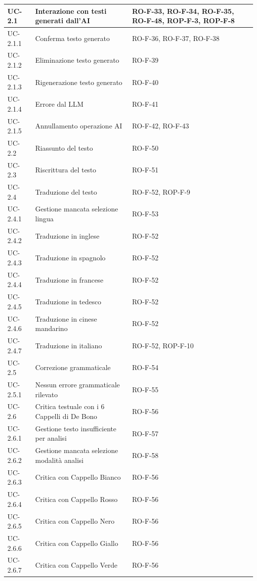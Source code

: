 \documentclass[11pt,a4paper]{article}
\begin{document}
\begin{longtable}{|p{}|p{}|>{\raggedright\arraybackslash}p{}|}
\hline
UC-2.1 & Interazione con testi generati dall'AI & RO-F-33, RO-F-34, RO-F-35, RO-F-48, ROP-F-3, ROP-F-8 \\
\hline
UC-2.1.1 & Conferma testo generato & RO-F-36, RO-F-37, RO-F-38 \\
\hline
UC-2.1.2 & Eliminazione testo generato & RO-F-39 \\
\hline
UC-2.1.3 & Rigenerazione testo generato & RO-F-40 \\
\hline
UC-2.1.4 & Errore dal LLM & RO-F-41 \\
\hline
UC-2.1.5 & Annullamento operazione AI & RO-F-42, RO-F-43 \\
\hline
UC-2.2 & Riassunto del testo & RO-F-50 \\
\hline
UC-2.3 & Riscrittura del testo & RO-F-51 \\
\hline
UC-2.4 & Traduzione del testo & RO-F-52, ROP-F-9 \\
\hline
UC-2.4.1 & Gestione mancata selezione lingua & RO-F-53 \\
\hline
UC-2.4.2 & Traduzione in inglese & RO-F-52 \\
\hline
UC-2.4.3 & Traduzione in spagnolo & RO-F-52 \\
\hline
UC-2.4.4 & Traduzione in francese & RO-F-52 \\
\hline
UC-2.4.5 & Traduzione in tedesco & RO-F-52 \\
\hline
UC-2.4.6 & Traduzione in cinese mandarino & RO-F-52 \\
\hline
UC-2.4.7 & Traduzione in italiano & RO-F-52, ROP-F-10 \\
\hline
UC-2.5 & Correzione grammaticale & RO-F-54 \\
\hline
UC-2.5.1 & Nessun errore grammaticale rilevato & RO-F-55 \\
\hline
UC-2.6 & Critica testuale con i 6 Cappelli di De Bono & RO-F-56 \\
\hline
UC-2.6.1 & Gestione testo insufficiente per analisi & RO-F-57 \\
\hline
UC-2.6.2 & Gestione mancata selezione modalità analisi & RO-F-58 \\
\hline
UC-2.6.3 & Critica con Cappello Bianco & RO-F-56 \\
\hline
UC-2.6.4 & Critica con Cappello Rosso & RO-F-56 \\
\hline
UC-2.6.5 & Critica con Cappello Nero & RO-F-56 \\
\hline
UC-2.6.6 & Critica con Cappello Giallo & RO-F-56 \\
\hline
UC-2.6.7 & Critica con Cappello Verde & RO-F-56 \\

\end{longtable}
\end{document}
